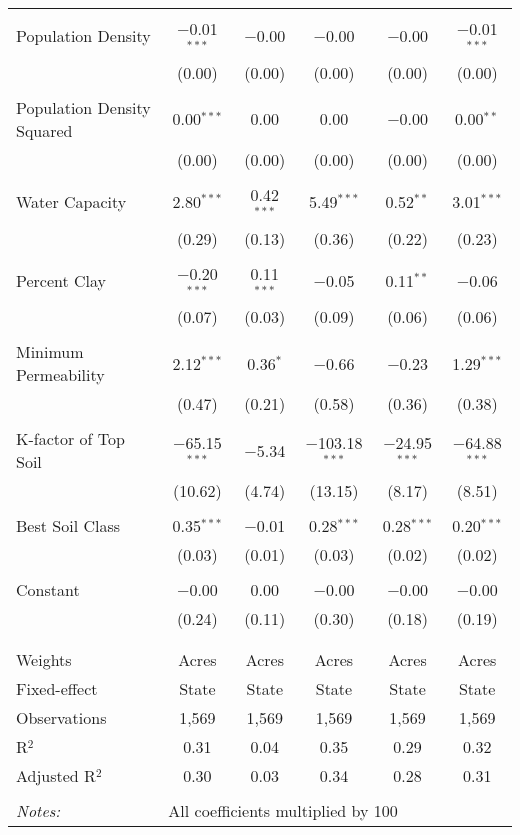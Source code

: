 \documentclass[10pt]{article}
\begin{document}
\begin{table}[!htbp]
\begin{tabular}{@{\extracolsep{5pt}}lccccc}
  & & & & & \\ 
 Population Density & $-$0.01$^{***}$ & $-$0.00 & $-$0.00 & $-$0.00 & $-$0.01$^{***}$ \\ 
  & (0.00) & (0.00) & (0.00) & (0.00) & (0.00) \\ 
  & & & & & \\ 
 Population Density Squared & 0.00$^{***}$ & 0.00 & 0.00 & $-$0.00 & 0.00$^{**}$ \\ 
  & (0.00) & (0.00) & (0.00) & (0.00) & (0.00) \\ 
  & & & & & \\ 
 Water Capacity & 2.80$^{***}$ & 0.42$^{***}$ & 5.49$^{***}$ & 0.52$^{**}$ & 3.01$^{***}$ \\ 
  & (0.29) & (0.13) & (0.36) & (0.22) & (0.23) \\ 
  & & & & & \\ 
 Percent Clay & $-$0.20$^{***}$ & 0.11$^{***}$ & $-$0.05 & 0.11$^{**}$ & $-$0.06 \\ 
  & (0.07) & (0.03) & (0.09) & (0.06) & (0.06) \\ 
  & & & & & \\ 
 Minimum Permeability & 2.12$^{***}$ & 0.36$^{*}$ & $-$0.66 & $-$0.23 & 1.29$^{***}$ \\ 
  & (0.47) & (0.21) & (0.58) & (0.36) & (0.38) \\ 
  & & & & & \\ 
 K-factor of Top Soil & $-$65.15$^{***}$ & $-$5.34 & $-$103.18$^{***}$ & $-$24.95$^{***}$ & $-$64.88$^{***}$ \\ 
  & (10.62) & (4.74) & (13.15) & (8.17) & (8.51) \\ 
  & & & & & \\ 
 Best Soil Class & 0.35$^{***}$ & $-$0.01 & 0.28$^{***}$ & 0.28$^{***}$ & 0.20$^{***}$ \\ 
  & (0.03) & (0.01) & (0.03) & (0.02) & (0.02) \\ 
  & & & & & \\ 
 Constant & $-$0.00 & 0.00 & $-$0.00 & $-$0.00 & $-$0.00 \\ 
  & (0.24) & (0.11) & (0.30) & (0.18) & (0.19) \\ 
  & & & & & \\ 
\hline \\[-1.8ex] 
Weights & Acres & Acres & Acres & Acres & Acres \\ 
Fixed-effect & State & State & State & State & State \\ 
Observations & 1,569 & 1,569 & 1,569 & 1,569 & 1,569 \\ 
R$^{2}$ & 0.31 & 0.04 & 0.35 & 0.29 & 0.32 \\ 
Adjusted R$^{2}$ & 0.30 & 0.03 & 0.34 & 0.28 & 0.31 \\ 
\hline 
\hline \\[-1.8ex] 
\textit{Notes:} & \multicolumn{5}{l}{All coefficients multiplied by 100} \\ 
\end{tabular} 
\end{table} 
\end{document}
